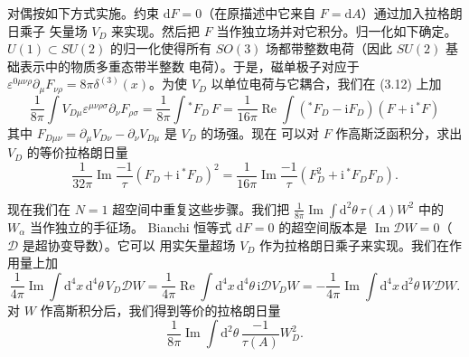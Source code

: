 \documentclass[11pt,a4paper,UTF8,fontset=fandol]{ctexart}
\theoremstyle{plain}
\theoremstyle{definition}
\newcommand{\dd}{\mathrm{d}}
\newcommand{\ii}{\mathrm{i}}
\renewcommand{\Re}{\operatorname{Re}}
\renewcommand{\Im}{\operatorname{Im}}
\newcommand{\Nc}{\mathcal{N}}
\newcommand{\Dd}{\mathcal{D}}
\def\Nc{N}%
\begin{document}
对偶按如下方式实施。约束 $\dd F=0$（在原描述中它来自 $F=\dd A$）通过加入拉格朗日乘子
矢量场 $V_D$ 来实现。然后把 $F$ 当作独立场并对它积分。归一化如下确定。$U(1)\subset SU(2)$
的归一化使得所有 $SO(3)$ 场都带整数电荷（因此 $SU(2)$ 基础表示中的物质多重态带半整数
电荷）。于是，磁单极子对应于 $\varepsilon^{0\mu\nu\rho}\partial_\mu F_{\nu\rho}
=8\pi\delta^{(3)}(x)$。为使 $V_D$ 以单位电荷与它耦合，我们在 (3.12) 上加
\begin{equation}
  \frac{1}{8\pi}\int V_{D\mu}\varepsilon^{\mu\nu\rho\sigma}\partial_\nu F_{\rho\sigma}
  =\frac{1}{8\pi}\int{}^{\ast}F_D\,F
  =\frac{1}{16\pi}\Re\int(^{\ast}F_D-\ii F_D)(F+\ii\,^{\ast}F) \tag{3.13}
\end{equation}
其中 $F_{D\mu\nu}=\partial_\mu V_{D\nu}-\partial_\nu V_{D\mu}$ 是 $V_D$ 的场强。现在
可以对 $F$ 作高斯泛函积分，求出 $V_D$ 的等价拉格朗日量
\begin{equation}
  \frac{1}{32\pi}\Im\frac{-1}{\tau}(F_D+\ii\,^{\ast}F_D)^2
  =\frac{1}{16\pi}\Im\frac{-1}{\tau}(F_D^2+\ii\,^{\ast}F_D F_D). \tag{3.14}
\end{equation}

现在我们在 $\Nc=1$ 超空间中重复这些步骤。我们把
$\frac{1}{8\pi}\Im\int \dd^2\theta\,\tau(A)W^2$ 中的 $W_\alpha$ 当作独立的手征场。
Bianchi 恒等式 $\dd F=0$ 的超空间版本是 $\Im \Dd W=0$（$\Dd$ 是超协变导数）。它可以
用实矢量超场 $V_D$ 作为拉格朗日乘子来实现。我们在作用量上加
\begin{equation}
  \frac{1}{4\pi}\Im\int \dd^4x\,\dd^4\theta\,V_D\Dd W
  =\frac{1}{4\pi}\Re\int \dd^4x\,\dd^4\theta\,\ii\Dd V_D W
  =-\frac{1}{4\pi}\Im\int \dd^4x\,\dd^2\theta\,W\Dd W. \tag{3.15}
\end{equation}
对 $W$ 作高斯积分后，我们得到等价的拉格朗日量
\begin{equation}
  \frac{1}{8\pi}\Im\int \dd^2\theta\,\frac{-1}{\tau(A)}W_D^2. \tag{3.16}
\end{equation}
\end{document}
